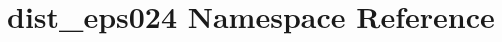 \hypertarget{namespacedist__eps024}{}\section{dist\+\_\+eps024 Namespace Reference}
\label{namespacedist__eps024}
